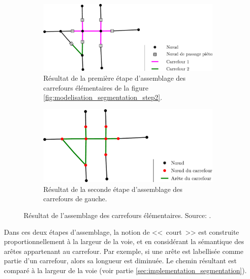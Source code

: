 \begin{figure}[ht]
    \centering
    \begin{subfigure}[t]{.49\linewidth}
        \includegraphics[width=\textwidth]{images/modelisation/segmentation/segmentation-step3.pdf}
        \caption{Résultat de la première étape d'assemblage des carrefours élémentaires de la figure \ref{fig:modelisation_segmentation_step2}.\label{fig:modelisation_segmentation_step3}}
    \end{subfigure}
    \hfill
    \begin{subfigure}[t]{.49\linewidth}
        \includegraphics[width=\textwidth]{images/modelisation/segmentation/segmentation-step4.pdf}
        \caption{Résultat de la seconde étape d'assemblage des carrefours de gauche.\label{fig:modelisation_segmentation_step4}}
    \end{subfigure}
    \caption[Assemblage de carrefours élémentaires]{Résultat de l'assemblage des carrefours élémentaires. Source: \citep{Favreau2022}.}
    \label{fig:modelisation_segmentation_step3&4}
\end{figure}

\newpar{}

Dans ces deux étapes d'assemblage, la notion de <<~court~>> est construite proportionnellement à la largeur de la voie, et en considérant la sémantique des arêtes appartenant au carrefour. Par exemple, si une arête est labellisée comme partie d'un carrefour, alors sa longueur est diminuée. Le chemin résultant est comparé à la largeur de la voie (voir partie \ref{sec:implementation_segmentation}).

